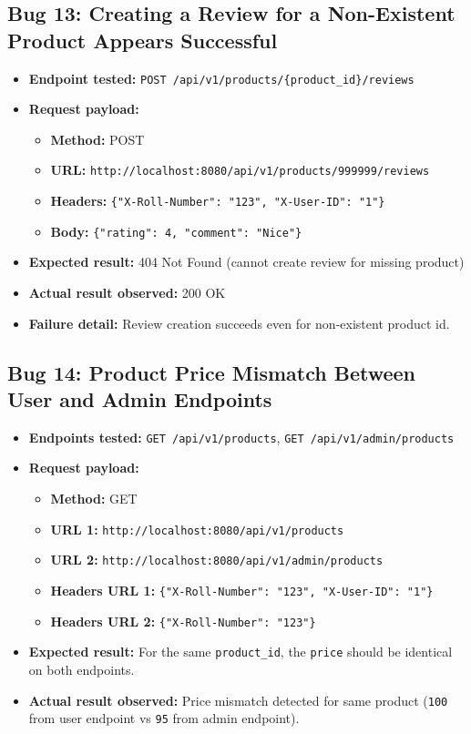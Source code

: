 ﻿\documentclass[11pt,a4paper]{article}
\begin{document}
\subsection*{Bug 13: Creating a Review for a Non-Existent Product Appears Successful}
\begin{itemize}
  \item \textbf{Endpoint tested:} \texttt{POST /api/v1/products/\{product_id\}/reviews}
  \item \textbf{Request payload:}
  \begin{itemize}
    \item \textbf{Method:} POST
    \item \textbf{URL:} \texttt{http://localhost:8080/api/v1/products/999999/reviews}
    \item \textbf{Headers:} \texttt{\{"X-Roll-Number": "123", "X-User-ID": "1"\}}
    \item \textbf{Body:} \texttt{\{"rating": 4, "comment": "Nice"\}}
  \end{itemize}
  \item \textbf{Expected result:} 404 Not Found (cannot create review for missing product)
  \item \textbf{Actual result observed:} 200 OK
  \item \textbf{Failure detail:} Review creation succeeds even for non-existent product id.
\end{itemize}

\subsection*{Bug 14: Product Price Mismatch Between User and Admin Endpoints}
\begin{itemize}
  \item \textbf{Endpoints tested:} \texttt{GET /api/v1/products}, \texttt{GET /api/v1/admin/products}
  \item \textbf{Request payload:}
  \begin{itemize}
    \item \textbf{Method:} GET
    \item \textbf{URL 1:} \texttt{http://localhost:8080/api/v1/products}
    \item \textbf{URL 2:} \texttt{http://localhost:8080/api/v1/admin/products}
    \item \textbf{Headers URL 1:} \texttt{\{"X-Roll-Number": "123", "X-User-ID": "1"\}}
    \item \textbf{Headers URL 2:} \texttt{\{"X-Roll-Number": "123"\}}
  \end{itemize}
  \item \textbf{Expected result:} For the same \texttt{product_id}, the \texttt{price} should be identical on both endpoints.
  \item \textbf{Actual result observed:} Price mismatch detected for same product (\texttt{100} from user endpoint vs \texttt{95} from admin endpoint).
\end{itemize}
\end{document}
